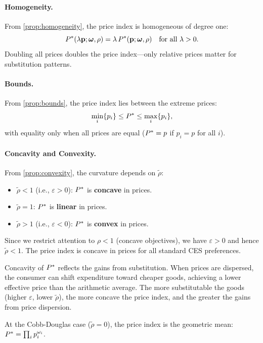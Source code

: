 \paragraph{Homogeneity.}
From \cref{prop:homogeneity}, the price index is homogeneous of degree one:
\begin{equation}
P^{*}(\lambda \mathbf{p}; \boldsymbol{\omega}, \rho) = \lambda \, P^{*}(\mathbf{p}; \boldsymbol{\omega}, \rho) \quad \text{for all } \lambda > 0.
\end{equation}
Doubling all prices doubles the price index---only relative prices matter for substitution patterns.

\paragraph{Bounds.}
From \cref{prop:bounds}, the price index lies between the extreme prices:
\begin{equation}
\min_i \{p_i\} \leq P^{*} \leq \max_i \{p_i\},
\end{equation}
with equality only when all prices are equal ($P^{*} = p$ if $p_i = p$ for all $i$).

\paragraph{Concavity and Convexity.}
From \cref{prop:convexity}, the curvature depends on $\tilde{\rho}$:
\begin{itemize}[leftmargin=2em]
\item $\tilde{\rho} < 1$ (i.e., $\varepsilon > 0$): $P^{*}$ is \textbf{concave} in prices.
\item $\tilde{\rho} = 1$: $P^{*}$ is \textbf{linear} in prices.
\item $\tilde{\rho} > 1$ (i.e., $\varepsilon < 0$): $P^{*}$ is \textbf{convex} in prices.
\end{itemize}

Since we restrict attention to $\rho < 1$ (concave objectives), we have $\varepsilon > 0$ and hence $\tilde{\rho} < 1$. The price index is concave in prices for all standard CES preferences.

\begin{calloutnote}
Concavity of $P^{*}$ reflects the gains from substitution. When prices are dispersed, the consumer can shift expenditure toward cheaper goods, achieving a lower effective price than the arithmetic average. The more substitutable the goods (higher $\varepsilon$, lower $\tilde{\rho}$), the more concave the price index, and the greater the gains from price dispersion.

At the Cobb-Douglas case ($\tilde{\rho} = 0$), the price index is the geometric mean: $P^{*} = \prod_i p_i^{\omega_i}$.
\end{calloutnote}

